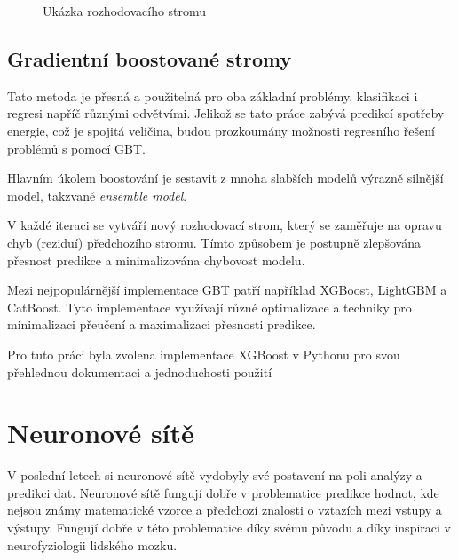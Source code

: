 \documentclass[FM,BP,fonts]{tulthesis}
\begin{document}
\begin{figure}[htbp]
	\centering
	\caption{Ukázka rozhodovacího stromu}
	\label{fig:my_graph}
\end{figure}
\subsection{Gradientní boostované stromy}\label{xgboost_research}
Tato metoda je přesná a použitelná pro oba základní problémy, klasifikaci i regresi napříč různými odvětvími. Jelikož se tato práce zabývá predikcí spotřeby energie, což je spojitá veličina, budou prozkoumány možnosti regresního řešení problémů s pomocí GBT.

Hlavním úkolem boostování je sestavit z mnoha slabších modelů výrazně silnější model, takzvaně \textit{ensemble  model}. \cite{chen2016xgboost}

V každé iteraci se vytváří nový rozhodovací strom, který se zaměřuje na opravu chyb (reziduí) předchozího stromu. Tímto způsobem je postupně zlepšována přesnost predikce a minimalizována chybovost modelu. 

Mezi nejpopulárnější implementace GBT patří například XGBoost, LightGBM a CatBoost. Tyto implementace využívají různé optimalizace a techniky pro minimalizaci přeučení a maximalizaci přesnosti predikce.

Pro tuto práci byla zvolena implementace XGBoost v Pythonu pro svou přehlednou dokumentaci a jednoduchosti použití


\section{Neuronové sítě}
V poslední letech si neuronové sítě vydobyly své postavení na poli analýzy a predikci dat. Neuronové sítě fungují dobře v problematice predikce hodnot, kde nejsou známy matematické vzorce a předchozí znalosti o vztazích mezi vstupy a výstupy. Fungují dobře v této problematice díky svému původu a díky inspiraci v neurofyziologii lidského mozku.
\end{document}
